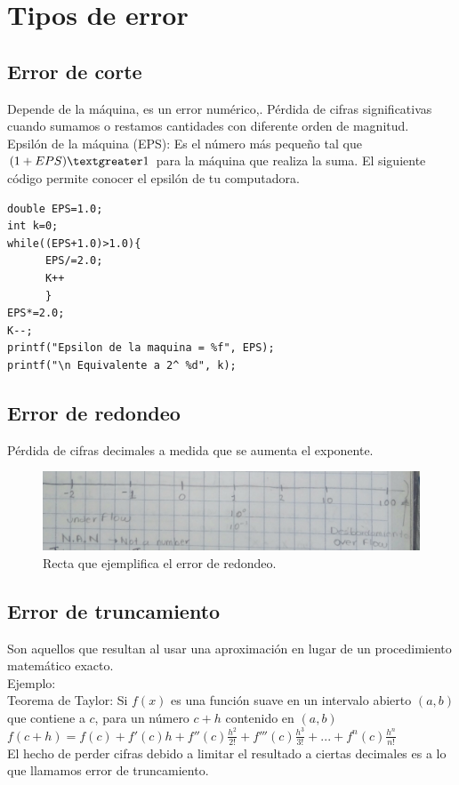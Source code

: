 \section{Tipos de error}

\subsection{Error de corte}
Depende de la m\'aquina, es un error num\'erico,. P\'erdida de cifras significativas cuando sumamos o restamos cantidades con diferente orden de magnitud.\\

Epsil\'on de la m\'aquina (EPS): Es el n\'umero m\'as pequeño tal que $(1+EPS)\textgreater1$ para la m\'aquina que realiza la suma.
El siguiente c\'odigo permite conocer el epsil\'on de tu computadora.
\medskip
\begin{verbatim}
double EPS=1.0;
int k=0;
while((EPS+1.0)>1.0){
      EPS/=2.0;
      K++
      }
EPS*=2.0;
K--;
printf("Epsilon de la maquina = %f", EPS);
printf("\n Equivalente a 2^ %d", k);
\end{verbatim}

\subsection{Error de redondeo} 
P\'erdida de cifras decimales a medida que se aumenta el exponente.

\begin{figure}[h]
\includegraphics[scale=.16]{recta-error-redondeo}
\centering
\caption{Recta que ejemplifica el error de redondeo.}
\end{figure}

\subsection{Error de truncamiento}
Son aquellos que resultan al usar una aproximaci\'on en lugar de un procedimiento matem\'atico exacto.\\
Ejemplo:\\
Teorema de Taylor: Si $f(x)$ es una funci\'on suave en un intervalo abierto $(a,b)$ que contiene a $c$, para un n\'umero $c+h$ contenido en $(a,b)$ \\
$f(c+h)=f(c)+f'(c)h+f''(c)\frac{h^2}{2!}+f'''(c)\frac{h^3}{3!}+...+f^n(c)\frac{h^n}{n!}$ \\
El hecho de perder cifras debido a limitar el resultado a ciertas decimales es a lo que llamamos error de truncamiento.\\

